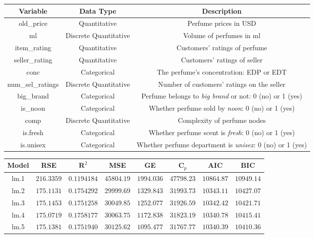 \documentclass[12pt]{amsart}
\begin{document}
    \begin{center}
        \begin{tabular}{ c | c | c }
             \textbf{Variable} & \textbf{Data Type} & \textbf{Description} \\ \hline
             old\_price & Quantitative & Perfume prices in USD \\  
             ml & Discrete Quantitative & Volume of perfumes in ml \\
             item\_rating & Quantitative & Customers’ ratings of perfume \\
             seller\_rating & Quantitative & Customers' ratings of seller \\
             conc & Categorical & The perfume’s concentration: EDP or EDT \\
             num\_sel\_ratings & Discrete Quantitative & Number of customers’ ratings on the seller \\
             big\_brand & Categorical & Perfume belongs to \emph{big brand} or not: 0 (no) or 1 (yes) \\
             is\_noon & Categorical & Whether perfume sold by \emph{noon}: 0 (no) or 1 (yes) \\
             comp & Discrete Quantitative & Complexity of perfume nodes \\
             is.fresh & Categorical & Whether perfume scent is \emph{fresh}: 0 (no) or 1 (yes) \\
             is.unisex & Categorical & Whether perfume department is \emph{unisex}: 0 (no) or 1 (yes)
        \end{tabular}
    \end{center}
    
    \begin{center}
        \begin{tabular}{ c c c c c c c c}
            \hline
             \textbf{Model} & \textbf{RSE} & $\boldsymbol{R}^2$ & \textbf{MSE} & \textbf{GE} & $\boldsymbol{C}_p$ & \textbf{AIC} & \textbf{BIC}  \\ \hline
             lm.1 & $216.3359$ & $0.1194184$ & $45804.19$ & $1994.036$ & $47798.23$ & $10864.87$ & $10949.14$ \\
             lm.2 & $175.1131$ & $0.1754292$ & $29999.69$ & $1329.843$ & $31993.73$ & $10343.11$ & $10427.07$ \\
             lm.3 & $175.1453$ & $0.1751258$ & $30049.85$ & $1252.077$ & $31926.59$ & $10342.42$ & $10421.71$ \\
             lm.4 & $175.0719$ & $0.1758177$ & $30063.75$ & $1172.838$ & $31823.19$ & $10340.78$ & $10415.41$ \\
             lm.5 & $175.1381$ & $0.1751940$ & $30125.62$ & $1095.477$ & $31767.77$ & $10340.39$ & $10410.36$ \\ \hline
        \end{tabular}
    \end{center}
    
\end{document}
